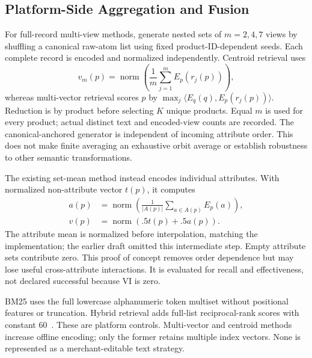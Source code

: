 \subsection{Platform-Side Aggregation and Fusion}
For full-record multi-view methods, generate nested sets of $m=2,4,7$ views by shuffling a canonical raw-atom list using fixed product-ID-dependent seeds. Each complete record is encoded and normalized independently. Centroid retrieval uses
\begin{equation}
v_m(p)=\operatorname{norm}\left(\frac1m\sum_{j=1}^{m}E_p(r_j(p))\right),
\end{equation}
whereas multi-vector retrieval scores $p$ by $\max_j\langle E_q(q),E_p(r_j(p))\rangle$. Reduction is by product before selecting $K$ unique products. Equal $m$ is used for every product; actual distinct text and encoded-view counts are recorded. The canonical-anchored generator is independent of incoming attribute order. This does not make finite averaging an exhaustive orbit average or establish robustness to other semantic transformations.

The existing set-mean method instead encodes individual attributes. With normalized non-attribute vector $t(p)$, it computes
\begin{equation}
\begin{aligned}
a(p)&=\operatorname{norm}\left(\frac1{|A(p)|}\sum_{a\in A(p)}E_p(a)\right),\\
v(p)&=\operatorname{norm}(.5t(p)+.5a(p)).
\end{aligned}
\end{equation}
The attribute mean is normalized before interpolation, matching the implementation; the earlier draft omitted this intermediate step. Empty attribute sets contribute zero. This proof of concept removes order dependence but may lose useful cross-attribute interactions. It is evaluated for recall and effectiveness, not declared successful because VI is zero.

BM25 uses the full lowercase alphanumeric token multiset without positional features or truncation. Hybrid retrieval adds full-list reciprocal-rank scores with constant 60~\cite{cormack2009rrf}. These are platform controls. Multi-vector and centroid methods increase offline encoding; only the former retains multiple index vectors. None is represented as a merchant-editable text strategy.
